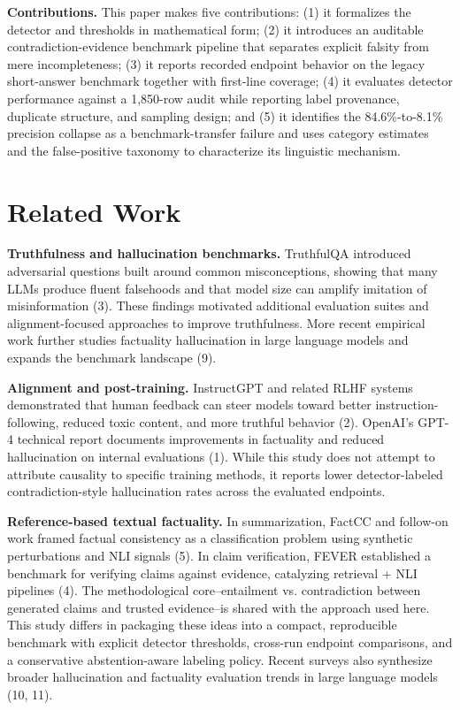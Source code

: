 \documentclass[11pt]{article}
\begin{document}
\textbf{Contributions.} This paper makes five contributions: (1) it formalizes the detector and thresholds in mathematical form; (2) it introduces an auditable contradiction-evidence benchmark pipeline that separates explicit falsity from mere incompleteness; (3) it reports recorded endpoint behavior on the legacy short-answer benchmark together with first-line coverage; (4) it evaluates detector performance against a 1,850-row audit while reporting label provenance, duplicate structure, and sampling design; and (5) it identifies the 84.6\%-to-8.1\% precision collapse as a benchmark-transfer failure and uses category estimates and the false-positive taxonomy to characterize its linguistic mechanism.

\section*{Related Work}
\textbf{Truthfulness and hallucination benchmarks.} TruthfulQA introduced adversarial questions built around common misconceptions, showing that many LLMs produce fluent falsehoods and that model size can amplify imitation of misinformation (3). These findings motivated additional evaluation suites and alignment-focused approaches to improve truthfulness. More recent empirical work further studies factuality hallucination in large language models and expands the benchmark landscape (9).

\textbf{Alignment and post-training.} InstructGPT and related RLHF systems demonstrated that human feedback can steer models toward better instruction-following, reduced toxic content, and more truthful behavior (2). OpenAI's GPT-4 technical report documents improvements in factuality and reduced hallucination on internal evaluations (1). While this study does not attempt to attribute causality to specific training methods, it reports lower detector-labeled contradiction-style hallucination rates across the evaluated endpoints.

\textbf{Reference-based textual factuality.} In summarization, FactCC and follow-on work framed factual consistency as a classification problem using synthetic perturbations and NLI signals (5). In claim verification, FEVER established a benchmark for verifying claims against evidence, catalyzing retrieval + NLI pipelines (4). The methodological core--entailment vs. contradiction between generated claims and trusted evidence--is shared with the approach used here. This study differs in packaging these ideas into a compact, reproducible benchmark with explicit detector thresholds, cross-run endpoint comparisons, and a conservative abstention-aware labeling policy. Recent surveys also synthesize broader hallucination and factuality evaluation trends in large language models (10, 11).
\end{document}
